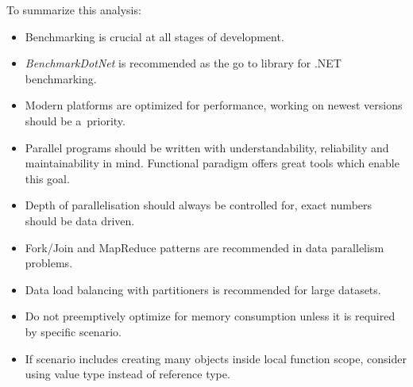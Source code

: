 To summarize this analysis: 
\begin{itemize}
	\item Benchmarking is crucial at all stages of development.
	\item \emph{BenchmarkDotNet} is recommended as the go to library for .NET benchmarking.
	\item Modern platforms are optimized for performance, working on newest versions should be a~priority.
	\item Parallel programs should be written with understandability, reliability and maintainability in mind. Functional paradigm offers great tools which enable this goal.
	\item Depth of parallelisation should always be controlled for, exact numbers should be data driven.
	\item Fork/Join and MapReduce patterns are recommended in data parallelism problems. 
	\item Data load balancing with partitioners is recommended for large datasets.
	\item Do not preemptively optimize for memory consumption unless it is required by specific scenario.
	\item If scenario includes creating many objects inside local function scope, consider using value type instead of reference type.

\end{itemize}
